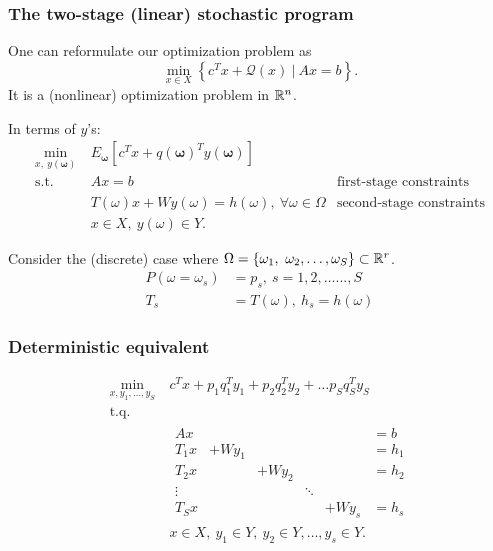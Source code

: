 \documentclass{beamer}
\def\bomega{\boldsymbol\omega}
\begin{document}
\begin{frame}
\frametitle{The two-stage (linear) stochastic program}

One can reformulate our optimization problem as
\[
\min_{x \in X} \left\lbrace c^T x + \mathcal{Q}(x) \ |\  Ax = b \right\rbrace.
\]
It is a (nonlinear) optimization problem in $\mathbb{R}^n$.

\mbox{}

In terms of $y$'s:
\begin{align*}
\min_{x,\ y(\bomega)}\ & E_{\bomega} [ c^T x + q(\bomega)^T y(\bomega) ] \\
\mbox{s.t. } & Ax = b & \mbox{first-stage constraints} \\
& T(\omega)x + Wy(\omega) = h(\omega),\ \forall \omega \in \Omega &
\mbox{second-stage constraints} \\
& x \in X,\ y(\omega) \in Y.
\end{align*}

Consider the (discrete) case where $\Omega = \lbrace \omega_1,\
\omega_2,\ldots,\omega_S \rbrace \subset \mathbb{R}^r$.
\begin{align*}
P(\omega = \omega_s) & = p_s,\ s = 1, 2,\ldots . . . , S \\
T_s & = T (\omega),\ h_s = h(\omega) 
\end{align*}

\end{frame}

\begin{frame}
\frametitle{Deterministic equivalent}

\begin{align*}
\min_{x, y_1, \ldots, y_S}\ & c^T x + p_1 q_1^T y_1 + p_2 q_2^T y_2 + \ldots
p_S q_S^Ty_S \\
\mbox{t.q. } & \\
& \begin{matrix} Ax & & & & & = b\\
T_1 x & + W y_1 & & & & = h_1 \\
T_2 x & & + W y_2 & & & = h_2 \\
\vdots & & & \ddots & \\
T_S x & & & & + W y_s & = h_s
\end{matrix} \\
& x \in X,\ y_1 \in Y,\ y_2 \in Y,\ldots, y_s \in Y.
\end{align*}

\end{frame}
\end{document}
